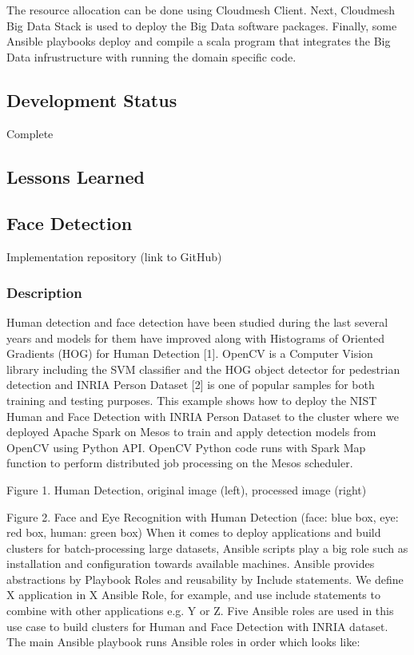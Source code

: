 \documentclass[9pt,twocolumn,twoside]{styles/osajnl}
\begin{document}
The resource allocation can be done using Cloudmesh Client.
Next, Cloudmesh Big Data Stack is used to deploy the Big Data software packages.
Finally, some Ansible playbooks deploy and compile a scala program that integrates the Big Data infrustructure with running the domain specific code.

\subsection{Development Status}

Complete



\subsection{Lessons Learned}

\subsection{Face Detection}

Implementation repository (link to GitHub)
\subsubsection{Description}

Human detection and face detection have been studied during the last several years and models for them have improved along with Histograms of Oriented Gradients (HOG) for Human Detection [1]. OpenCV is a Computer Vision library including the SVM classifier and the HOG object detector for pedestrian detection and INRIA Person Dataset [2] is one of popular samples for both training and testing purposes. This example shows how to deploy the NIST Human and Face Detection with INRIA Person Dataset to the cluster where we deployed Apache Spark on Mesos to train and apply detection models from OpenCV using Python API. OpenCV Python code runs with Spark Map function to perform distributed job processing on the Mesos scheduler.
  
  

Figure 1. Human Detection, original image (left), processed image (right)
  
  

Figure 2. Face and Eye Recognition with Human Detection (face: blue box, eye: red box, human: green box)
When it comes to deploy applications and build clusters for batch-processing large datasets, Ansible scripts play a big role such as installation and configuration towards available machines. Ansible provides abstractions by Playbook Roles and reusability by Include statements. We define X application in X Ansible Role, for example, and use include statements to combine with other applications e.g. Y or Z. Five Ansible roles are used in this use case to build clusters for Human and Face Detection with INRIA dataset. The main Ansible playbook runs Ansible roles in order which looks like:
\end{document}

